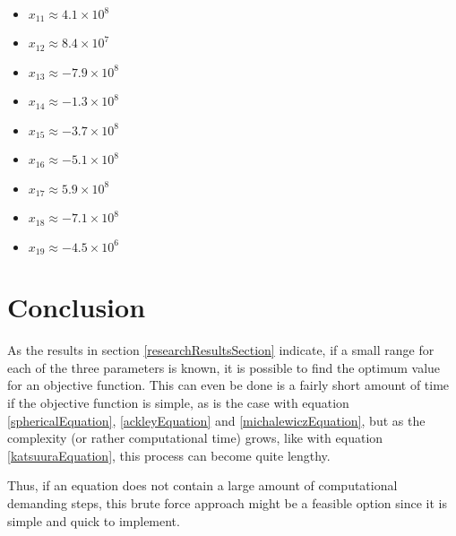 \documentclass[hidelinks,english,conference]{IEEEtran}
\begin{document}
\begin{itemize}
\begin{itemize}
			\item $x_{11} \approx 4.1 \times 10^{8}$
			\item $x_{12} \approx 8.4 \times 10^{7}$
			\item $x_{13} \approx -7.9 \times 10^{8}$
			\item $x_{14} \approx -1.3 \times 10^{8}$
			\item $x_{15} \approx -3.7 \times 10^{8}$
			\item $x_{16} \approx -5.1 \times 10^{8}$
			\item $x_{17} \approx 5.9 \times 10^{8}$
			\item $x_{18} \approx -7.1 \times 10^{8}$
			\item $x_{19} \approx -4.5 \times 10^{6}$
		\end{itemize}
\end{itemize}

\section{Conclusion}
As the results in section \ref{researchResultsSection} indicate, if a small range for each of the three parameters is known, it is possible to find the optimum value for an objective function. This can even be done is a fairly short amount of time if the objective function is simple, as is the case with equation \ref{sphericalEquation}, \ref{ackleyEquation} and \ref{michalewiczEquation}, but as the complexity (or rather computational time) grows, like with equation \ref{katsuuraEquation}, this process can become quite lengthy.

Thus, if an equation does not contain a large amount of computational demanding steps, this brute force approach might be a feasible option since it is simple and quick to implement.




\end{document}
